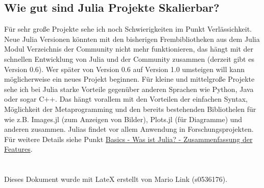 \documentclass[11pt]{article}
\begin{document}
\newpage
\subsection{Wie gut sind Julia Projekte Skalierbar?}
Für sehr große Projekte sehe ich noch Schwierigkeiten im Punkt Verlässichkeit. Neue Julia Versionen könnten mit den bisherigen Frembibliotheken aus dem Julia Modul Verzeichnis der Community nicht mehr funktionieren, das hängt mit der schnellen Entwicklung von Julia und der Community zusammen (derzeit gibt es Version 0.6). Wer später von Version 0.6 auf Version 1.0 umsteigen will kann möglicherweise ein neues Projekt beginnen. Für kleine und mittelgroße Projekte sehe ich bei Julia starke Vorteile gegenüber anderen Sprachen wie Python, Java oder sogar C++. Das hängt vorallem mit den Vorteilen der einfachen Syntax, Möglichkeit der Metaprogramming und den bereits bestehenden Bibliothelen für wie z.B. Images.jl (zum Anzeigen von Bilder), Plots.jl (für Diagramme) und anderen zusammen. Julias findet vor allem Anwendung in Forschungsprojekten. Für weitere Details siehe Punkt \hyperlink{basics}{Basics - Was ist Julia? - Zusammenfassung der Features}.\\
\mbox{}\\
\mbox{}\\

Dieses Dokument wurde mit LateX erstellt von Mario Link (s0536176).

\Signature
\end{document}
